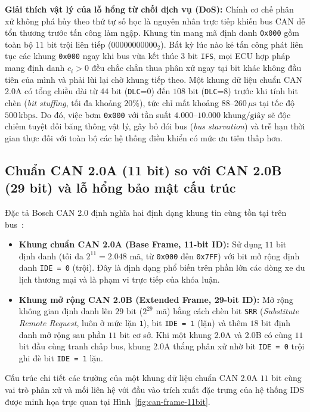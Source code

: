 \documentclass[12pt, a4paper, reqno, oneside]{book}
\DeclareRobustCommand{\code}[1]{\nolinkurl{#1}}
\begin{document}
\textbf{Giải thích vật lý của lỗ hổng từ chối dịch vụ (DoS):} Chính cơ chế phân xử không phá hủy theo thứ tự số học là nguyên nhân trực tiếp khiến bus CAN dễ tổn thương trước tấn công làm ngập. Khung tin mang mã định danh \texttt{0x000} gồm toàn bộ $11$ bit trội liên tiếp ($00000000000_2$). Bất kỳ lúc nào kẻ tấn công phát liên tục các khung \texttt{0x000} ngay khi bus vừa kết thúc $3$ bit \code{IFS}, mọi ECU hợp pháp mang định danh $c_i > 0$ đều chắc chắn thua phân xử ngay tại bit khác không đầu tiên của mình và phải lùi lại chờ khung tiếp theo. Một khung dữ liệu chuẩn CAN 2.0A có tổng chiều dài từ $44$ bit (\code{DLC}=0) đến $108$ bit (\code{DLC}=8) trước khi tính bit chèn (\textit{bit stuffing}, tối đa khoảng $20\%$), tức chỉ mất khoảng $88\text{--}260\,\mu\text{s}$ tại tốc độ $500\,\text{kbps}$. Do đó, việc bơm \texttt{0x000} với tần suất $4.000\text{--}10.000\text{ khung/giây}$ sẽ độc chiếm tuyệt đối băng thông vật lý, gây bỏ đói bus (\textit{bus starvation}) và trễ hạn thời gian thực đối với toàn bộ các hệ thống điều khiển có mức ưu tiên thấp hơn.

\subsection{Chuẩn CAN 2.0A (11 bit) so với CAN 2.0B (29 bit) và lỗ hổng bảo mật cấu trúc}
Đặc tả Bosch CAN 2.0 định nghĩa hai định dạng khung tin cùng tồn tại trên bus~\cite{bosch1991can,iso11898_1_2015}:
\begin{itemize}
    \item \textbf{Khung chuẩn CAN 2.0A (Base Frame, 11-bit ID):} Sử dụng $11$ bit định danh (tối đa $2^{11} = 2.048$ mã, từ \texttt{0x000} đến \texttt{0x7FF}) với bit mở rộng định danh \code{IDE = 0} (trội). Đây là định dạng phổ biến trên phần lớn các dòng xe du lịch thương mại và là phạm vi trực tiếp của khóa luận.
    \item \textbf{Khung mở rộng CAN 2.0B (Extended Frame, 29-bit ID):} Mở rộng không gian định danh lên $29$ bit ($2^{29}$ mã) bằng cách chèn bit \code{SRR} (\textit{Substitute Remote Request}, luôn ở mức lặn \texttt{1}), bit \code{IDE = 1} (lặn) và thêm $18$ bit định danh mở rộng sau phần $11$ bit cơ sở. Khi một khung 2.0A và 2.0B có cùng $11$ bit đầu cùng tranh chấp bus, khung 2.0A thắng phân xử nhờ bit \code{IDE = 0} trội ghi đè bit \code{IDE = 1} lặn.
\end{itemize}

Cấu trúc chi tiết các trường của một khung dữ liệu chuẩn CAN 2.0A $11$ bit cùng vai trò phân xử và mối liên hệ với đầu vào trích xuất đặc trưng của hệ thống IDS được minh họa trực quan tại Hình~\ref{fig:can-frame-11bit}.
\end{document}

